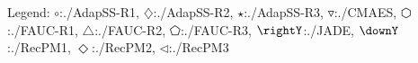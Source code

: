 Legend: {\color{NavyBlue}$\circ$}:./AdapSS-R1, {\color{Magenta}$\diamondsuit$}:./AdapSS-R2, {\color{Orange}$\star$}:./AdapSS-R3, {\color{CornflowerBlue}$\triangledown$}:./CMAES, {\color{red}$\varhexagon$}:./FAUC-R1, {\color{YellowGreen}$\triangle$}:./FAUC-R2, {\color{cyan}$\pentagon$}:./FAUC-R3, {\color{GreenYellow}$\rightY$}:./JADE, {\color{ForestGreen}$\downY$}:./RecPM1, {\color{Lavender}$\Diamond$}:./RecPM2, {\color{SkyBlue}$\triangleleft$}:./RecPM3